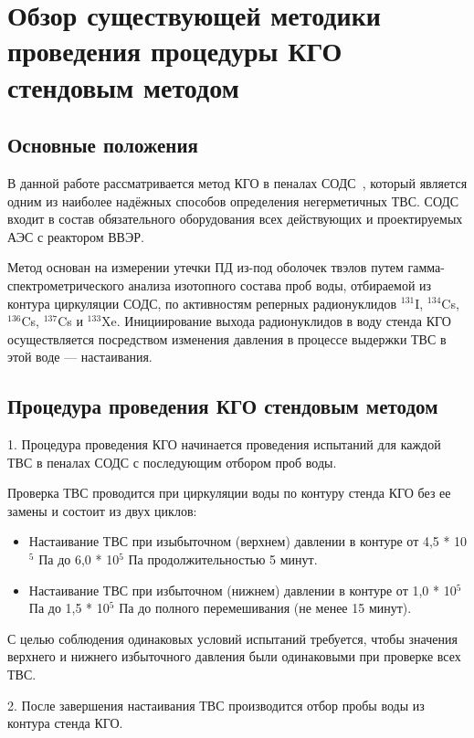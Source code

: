 
\section{Обзор существующей методики проведения процедуры КГО стендовым методом}

\subsection{Основные положения}

В данной работе рассматривается метод КГО в пеналах СОДС~\cite{RD}, который является одним из наиболее надёжных способов определения негерметичных ТВС. СОДС входит в состав обязательного оборудования всех действующих и проектируемых АЭС с реактором ВВЭР.

Метод основан на измерении утечки ПД из-под оболочек твэлов путем гамма-спектрометрического анализа изотопного состава проб воды, отбираемой из контура циркуляции СОДС, по активностям реперных радионуклидов $^{131}$I, $^{134}$Cs, $^{136}$Cs, $^{137}$Cs и $^{133}$Xe. Инициирование выхода радионуклидов в воду стенда КГО осуществляется посредством изменения давления в процессе выдержки ТВС в этой воде --- настаивания.

\subsection{Процедура проведения КГО стендовым методом}
1. Процедура проведения КГО начинается проведения испытаний для каждой ТВС в пеналах СОДС с последующим отбором проб воды. 

Проверка ТВС проводится при циркуляции воды по контуру стенда КГО без ее замены и состоит из двух циклов:
\begin{itemize}
\item Настаивание ТВС при изыбыточном (верхнем) давлении в контуре от 4,5 * 10$^{5}$ Па до 6,0 * 10$^{5}$ Па продолжительностью 5 минут.

\item Настаивание ТВС при избыточном (нижнем) давлении в контуре от 1,0 * 10$^{5}$ Па до 1,5 * 10$^{5}$ Па до полного перемешивания (не менее 15 минут).
\end{itemize}

С целью соблюдения одинаковых условий испытаний требуется, чтобы значения верхнего и нижнего избыточного давления были одинаковыми при проверке всех ТВС. 

2. После завершения настаивания ТВС производится отбор пробы воды из контура стенда КГО.

